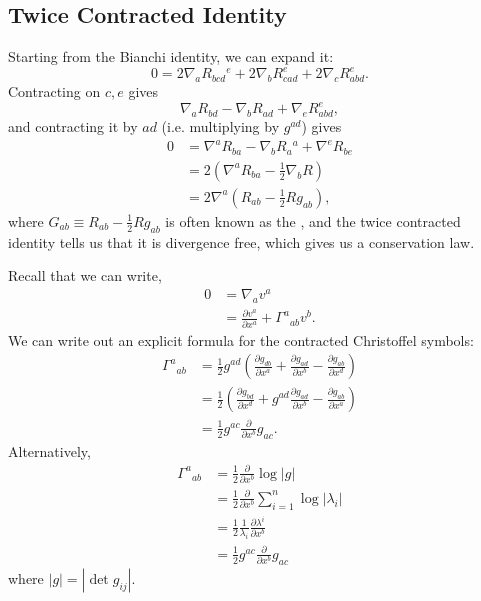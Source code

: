 \documentclass{article}
\numberwithin{equation}{section}
\begin{document}
\subsection{Twice Contracted Identity}
Starting from the Bianchi identity, we can expand it:
\begin{equation*}
    0 = 2\nabla_a R_{bcd}{}^{e} + 2\nabla_b R_{cad}^{e} + 2\nabla_c R_{abd}^e.
\end{equation*}
Contracting on $c,e$ gives 
\begin{equation*}
    \nabla_a R_{bd} - \nabla_b R_{ad} + \nabla_e R_{abd}^e,
\end{equation*}
and contracting it by $ad$ (i.e. multiplying by $g^{ad}$) gives 
\begin{align*}
    0 &= \nabla^a R_{ba} - \nabla_b R_a{}^a + \nabla^e R_{be} \\ 
    &= 2\left(\nabla^a R_{ba} - \frac{1}{2}\nabla_b R\right) \\ 
    &= 2\nabla^a \left(R_{ab} - \frac{1}{2}Rg_{ab}\right),
\end{align*}
where $G_{ab} \equiv R_{ab}-\frac{1}{2}Rg_{ab}$ is often known as the , and the twice contracted identity tells us that it is divergence free, which gives us a conservation law.

Recall that we can write,
\begin{align*}
    0 &= \nabla_a v^a \\ 
    &= \frac{\partial v^a}{\partial x^a} + \Gamma^a{}_{ab}v^b.
\end{align*}
We can write out an explicit formula for the contracted Christoffel symbols:
\begin{align*}
    \Gamma^a{}_{ab} &= \frac{1}{2}g^{ad} \left(\frac{\partial g_{db}}{\partial x^a} + \frac{\partial g_{ad}}{\partial x^b} - \frac{\partial g_{ab}}{\partial x^d}\right) \\ 
    &= \frac{1}{2}\left(\frac{\partial g_{bd}}{\partial x^d} + g^{ad} \frac{\partial g_{ad}}{\partial x^b} - \frac{\partial g_{ab}}{\partial x^a}\right) \\ 
    &= \frac{1}{2}g^{ac}\frac{\partial}{\partial x^b}g_{ac}.
\end{align*}
Alternatively,
\begin{align*}
    \Gamma^{a}{}_{ab} &= \frac{1}{2}\frac{\partial}{\partial x^b}\log |g| \\ 
    &= \frac{1}{2}\frac{\partial}{\partial x^b} \sum_{i=1}^{n} \log |\lambda_i| \\ 
    &= \frac{1}{2} \frac{1}{\lambda_i}\frac{\partial \lambda^i}{\partial x^b} \\ 
    &= \frac{1}{2} g^{ac} \frac{\partial}{\partial x^b}g_{ac}
\end{align*}
where $|g| = |\det g_{ij}|.$
\end{document}
